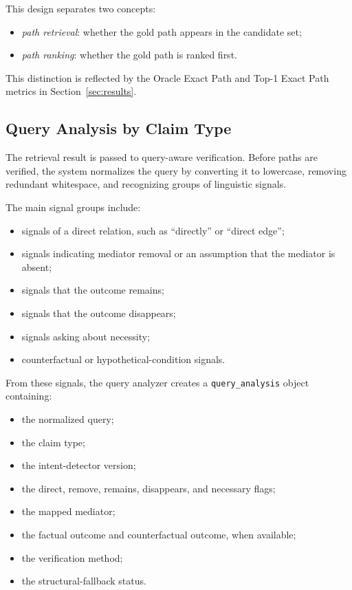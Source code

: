 This design separates two concepts:

\begin{itemize}
    \item \emph{path retrieval}: whether the gold path appears in the
    candidate set;

    \item \emph{path ranking}: whether the gold path is ranked first.
\end{itemize}

This distinction is reflected by the Oracle Exact Path and Top-1 Exact Path
metrics in Section~\ref{sec:results}.

\subsection{Query Analysis by Claim Type}

The retrieval result is passed to query-aware verification. Before paths are
verified, the system normalizes the query by converting it to lowercase,
removing redundant whitespace, and recognizing groups of linguistic signals.

The main signal groups include:

\begin{itemize}
    \item signals of a direct relation, such as ``directly'' or ``direct
    edge'';

    \item signals indicating mediator removal or an assumption that the
    mediator is absent;

    \item signals that the outcome remains;

    \item signals that the outcome disappears;

    \item signals asking about necessity;

    \item counterfactual or hypothetical-condition signals.
\end{itemize}

From these signals, the query analyzer creates a
\texttt{query\_analysis} object containing:

\begin{itemize}
    \item the normalized query;
    \item the claim type;
    \item the intent-detector version;
    \item the direct, remove, remains, disappears, and necessary flags;
    \item the mapped mediator;
    \item the factual outcome and counterfactual outcome, when available;
    \item the verification method;
    \item the structural-fallback status.
\end{itemize}


